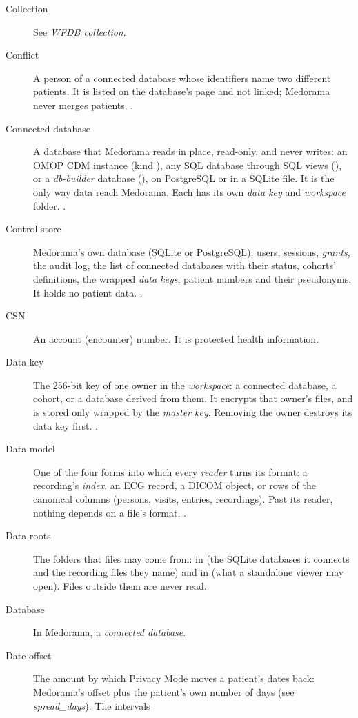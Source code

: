 \begin{description}
\item[Collection] See \textit{WFDB collection}.
\item[Conflict] A person of a connected database whose identifiers name two different patients.
  It is listed on the database's page and not linked; Medorama never merges patients.
  .
\item[Connected database] A database that Medorama reads in place, read-only, and never writes:
  an OMOP CDM instance (kind ), any SQL database through SQL views (), or
  a \textit{db-builder} database (), on PostgreSQL or in a SQLite file. It is the only
  way data reach Medorama. Each has its own \textit{data key} and \textit{workspace} folder.
  .
\item[Control store] Medorama's own database (SQLite or PostgreSQL): users, sessions,
  \textit{grants}, the audit log, the list of connected databases with their status, cohorts'
  definitions, the wrapped \textit{data keys}, patient numbers and their pseudonyms. It holds no
  patient data. .
\item[CSN] An account (encounter) number. It is protected health information.
\item[Data key] The 256-bit key of one owner in the \textit{workspace}: a connected database,
  a cohort, or a database derived from them. It encrypts that owner's files, and is stored only
  wrapped by the \textit{master key}. Removing the owner destroys its data key first.
  .
\item[Data model] One of the four forms into which every \textit{reader} turns its format: a
  recording's \textit{index}, an ECG record, a DICOM object, or rows of the canonical
  columns (persons, visits, entries, recordings). Past its reader, nothing depends on a file's format. .
\item[Data roots] The folders that files may come from:  in
   (the SQLite databases it connects and the recording files they name) and
  in  (what a standalone viewer may open). Files outside them are never
  read.
\item[Database] In Medorama, a \textit{connected database}.
\item[Date offset] The amount by which Privacy Mode moves a patient's dates back: Medorama's
  offset plus the patient's own number of days (see \textit{spread\_days}). The intervals

\end{description}
